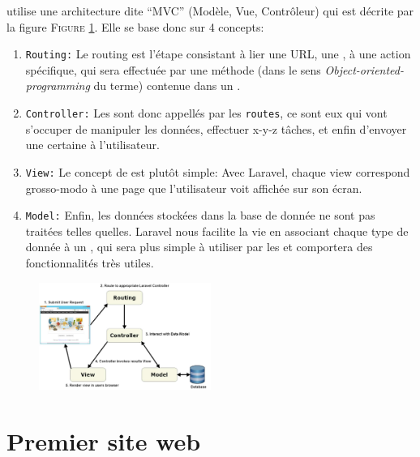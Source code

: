 \documentclass[internal]{nhitec_design}
\begin{document}
\laravel{}{} utilise une architecture dite ``MVC'' (Modèle, Vue, Contrôleur) qui est décrite par la figure \textsc{Figure }\ref{fig:laravel_diagram}. Elle se base donc sur 4 concepts:
\begin{enumerate}
    \item \texttt{Routing:} Le routing est l'étape consistant à lier une URL, une \route{}, à une action spécifique, qui sera effectuée par une méthode (dans le sens \textit{Object-oriented-programming} du terme) contenue dans un \controller{}.
    \item \texttt{Controller:} Les \controllers{} sont donc appellés par les \texttt{routes}, ce sont eux qui vont s'occuper de manipuler les données, effectuer x-y-z tâches, et enfin d'envoyer une certaine \view{} à l'utilisateur.
    \item \texttt{View:} Le concept de \view{} est plutôt simple: Avec Laravel, chaque view correspond grosso-modo à une page que l'utilisateur voit affichée sur son écran.
    \item \texttt{Model:} Enfin, les données stockées dans la base de donnée ne sont pas traitées telles quelles. Laravel nous facilite la vie en associant chaque type de donnée à un \model{}, qui sera plus simple à utiliser par les \controllers{} et comportera des fonctionnalités très utiles.
\end{enumerate}

\begin{figure}[!h]
    \centering
    \includegraphics[width=0.5\textwidth]{figures-C1/diagram.pdf}
    \caption{\label{fig:laravel_diagram}}
\end{figure}

\newpage

\section{Premier site web}
\end{document}
